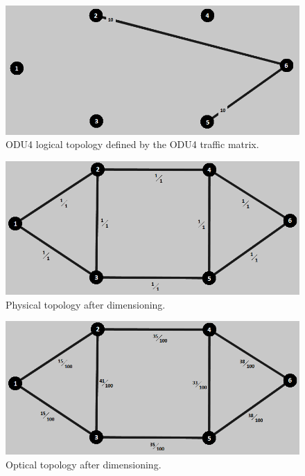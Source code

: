 \begin{figure}[H]
\centering
\includegraphics[width=13cm]{sdf/heuristic/opaque_protection/medium/logical_topology_odu4_medium}
\caption{ODU4 logical topology defined by the ODU4 traffic matrix.}
\label{logical_ODU4_protec_ref_medium_heuristic}
\end{figure}

\begin{figure}[H]
\centering
\includegraphics[width=13cm]{sdf/heuristic/opaque_protection/medium/physical_topology_medium}
\caption{Physical topology after dimensioning.}
\label{physical_topology_protec_ref_medium_heuristic}
\end{figure}

\begin{figure}[H]
\centering
\includegraphics[width=13cm]{sdf/heuristic/opaque_protection/medium/optical_topology_medium}
\caption{Optical topology after dimensioning.}
\label{optical_topology_protec_ref_medium_heuristic}
\end{figure}

